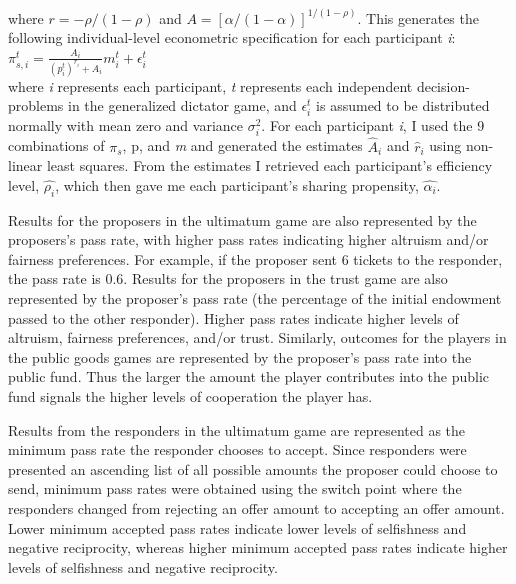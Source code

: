 \documentclass[12pt]{article}
\begin{document}
 \noindent
where \(r=-\rho / (1-\rho) \) and \(A=[\alpha / (1-\alpha)]^{1/(1-\rho)} \). This generates the following individual-level econometric specification for each participant \textit{i}: \\
 
\( \pi^{t}_{s,i} = \frac{A_{i}}{(p^{t}_{i})^{r_{i}} + A_{i}}m^{t}_{i} + \epsilon^{t}_{i}\) \\
 
\noindent
where \textit{i} represents each participant, \textit{t} represents each independent decision-problems in the generalized dictator game, and \( \epsilon^{t}_{i} \) is assumed to be distributed normally with mean zero and variance \(\sigma^{2}_{i}\). For each participant \textit{i}, I used the 9 combinations of \(\pi_{s}\), p, and \textit{m} and generated the estimates  \( \hat{A}_{i} \) and \( \hat{r}_{i} \) using non-linear least squares. From the estimates I retrieved each participant\rq s efficiency level, \( \hat{\rho_{i}}\), which then gave me each participant\rq s sharing propensity, \( \hat{\alpha_{i}} \).

Results for the proposers in the ultimatum game are also represented by the proposers\rq s pass rate, with higher pass rates indicating higher altruism and/or fairness preferences. For example, if the proposer sent 6 tickets to the responder, the pass rate is 0.6. Results for the proposers in the trust game are also represented by the proposer\rq s pass rate (the percentage of the initial endowment passed to the other responder). Higher pass rates indicate higher levels of altruism, fairness preferences, and/or trust. Similarly, outcomes for the players in the public goods games are represented by the proposer\rq s pass rate into the public fund. Thus the larger the amount the player contributes into the public fund signals the higher levels of cooperation the player has. 

Results from the responders in the ultimatum game are represented as the minimum pass rate the responder chooses to accept. Since responders were presented an ascending list of all possible amounts the proposer could choose to send, minimum pass rates were obtained using the switch point where the responders changed from rejecting an offer amount to accepting an offer amount. Lower minimum accepted pass rates indicate lower levels of selfishness and negative reciprocity, whereas higher minimum accepted pass rates indicate higher levels of selfishness and negative reciprocity.
\end{document}
